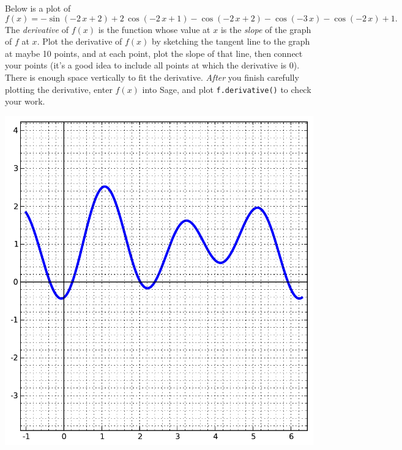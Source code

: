 Below is a plot of $$f(x)=-\sin\left(-2 \, x + 2\right) + 2 \, \cos\left(-2 \, x + 1\right) - \cos\left(-2 \, x + 2\right) - \cos\left(-3 \, x\right) - \cos\left(-2 \, x\right) + 1.$$  The {\em \color{red}derivative} of $f(x)$ is the function whose value at $x$ is the {\em slope} of the graph of $f$ at $x$.  Plot the derivative of $f(x)$ by sketching the tangent line to the graph at maybe 10 points, and at each point, plot the slope of that line, then connect your points (it's a good idea to include all points at which the derivative is 0).  There is enough space vertically to fit the derivative.  {\em After} you finish carefully plotting the derivative, enter $f(x)$ into Sage, and plot {\color{blue}\verb|f.derivative()|} to check your work.
\begin{center}\includegraphics{functions/97.pdf}\end{center}\newpage


